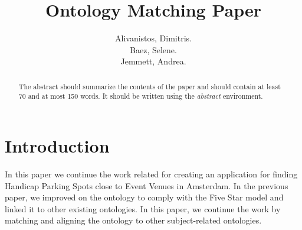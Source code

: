 \documentclass[runningheads,a4paper]{../../StyleFiles/llncs}
\begin{document}
\mainmatter  %

\title{Ontology Matching Paper}


%
%
\author{Alivanistos, Dimitris. \\ Baez, Selene. \\ Jemmett, Andrea.}
%


\maketitle


\begin{abstract}
The abstract should summarize the contents of the paper and should
contain at least 70 and at most 150 words. It should be written using the
\emph{abstract} environment.
\end{abstract}


\section{Introduction}
In this paper we continue the work related for creating an application for finding Handicap Parking Spots close to Event Venues in Amsterdam. In the previous paper, we improved on the ontology to comply with the Five Star model and linked it to other existing ontologies. In this paper, we continue the work by matching and aligning the ontology to other subject-related ontologies. 
\end{document}
